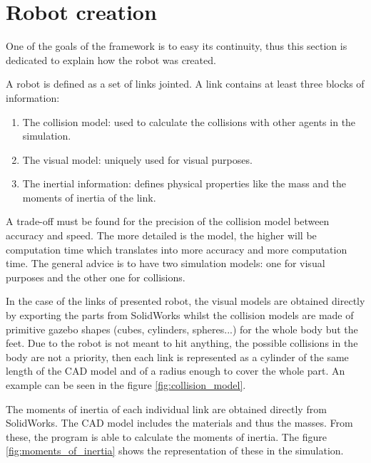 \section{Robot creation} %
\label{sec:robot_creation}
One of the goals of the framework is to easy its continuity, thus this section is dedicated to explain how the robot was created.

A robot is defined as a set of links jointed.
A link contains at least three blocks of information:
\begin{enumerate}
   \item The collision model: used to calculate the collisions with other agents in the simulation.
   \item The visual model: uniquely used for visual purposes.
   \item The inertial information: defines physical properties like the mass and the moments of inertia of the link.
\end{enumerate} 

A trade-off must be found for the precision of the collision model between accuracy and speed.
The more detailed is the model, the higher will be computation time which translates into more accuracy and more computation time.
The general advice is to have two simulation models: one for visual purposes and the other one for collisions.

In the case of the links of presented robot, the visual models are obtained directly by exporting the parts from SolidWorks whilst the collision models are made of primitive gazebo shapes (cubes, cylinders, spheres...) for the whole body but the feet.
Due to the robot is not meant to hit anything, the possible collisions in the body are not a priority, then each link is represented as a cylinder of the same length of the CAD model and of a radius enough to cover the whole part.
An example can be seen in the figure \ref{fig:collision_model}.

The moments of inertia of each individual link are obtained directly from SolidWorks.
The CAD model includes the materials and thus the masses.
From these, the program is able to calculate the moments of inertia.
The figure \ref{fig:moments_of_inertia} shows the representation of these in the simulation.


